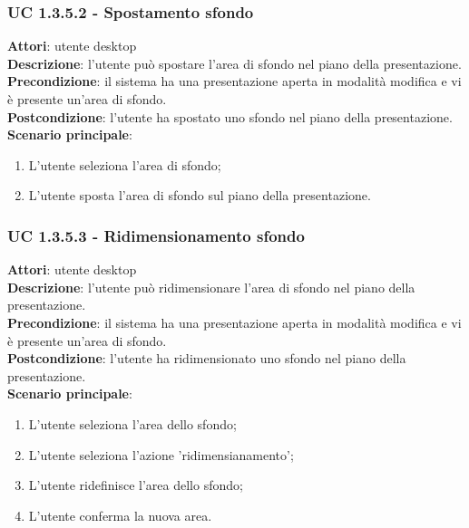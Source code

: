 \subsubsection{UC 1.3.5.2 - Spostamento sfondo}{
	\label{uc1.3.5.2}
	\textbf{Attori}: utente desktop \\
	\textbf{Descrizione}: l'utente può spostare l'area di sfondo nel piano della presentazione. \\
	\textbf{Precondizione}: il sistema ha una presentazione aperta in modalità modifica e vi è presente un'area di sfondo.	\\
	\textbf{Postcondizione}: l'utente ha spostato uno sfondo nel piano della presentazione.	\\
	\textbf{Scenario principale}:
	\begin{enumerate}
		\item L'utente seleziona l'area di sfondo;
		\item L'utente sposta l'area di sfondo sul piano della presentazione.
	\end{enumerate}
}
\subsubsection{UC 1.3.5.3 - Ridimensionamento sfondo}{
	\label{uc1.3.5.3}
	\textbf{Attori}: utente desktop \\
	\textbf{Descrizione}: l'utente può ridimensionare l'area di sfondo nel piano della presentazione. \\
	\textbf{Precondizione}: il sistema ha una presentazione aperta in modalità modifica e vi è presente un'area di sfondo.	\\
	\textbf{Postcondizione}: l'utente ha ridimensionato uno sfondo nel piano della presentazione.	\\
	\textbf{Scenario principale}:
	\begin{enumerate}
		\item L'utente seleziona l'area dello sfondo;
		\item L'utente seleziona l'azione 'ridimensianamento';
		\item L'utente ridefinisce l'area dello sfondo;
		\item L'utente conferma la nuova area.
	\end{enumerate}
}
